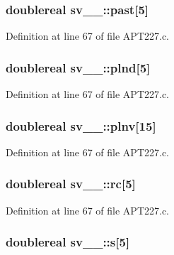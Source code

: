 \subsubsection[{\texorpdfstring{past}{past}}]{\setlength{\rightskip}{0pt plus 5cm}doublereal sv\+\_\+\_\+\+::past\mbox{[}5\mbox{]}}\hypertarget{structsv__1___a5b1db8c4c47306f0ac441f1c69b197ed}{}\label{structsv__1___a5b1db8c4c47306f0ac441f1c69b197ed}


Definition at line 67 of file A\+P\+T227.\+c.

\subsubsection[{\texorpdfstring{plnd}{plnd}}]{\setlength{\rightskip}{0pt plus 5cm}doublereal sv\+\_\+\_\+\+::plnd\mbox{[}5\mbox{]}}\hypertarget{structsv__1___a275dabf0aa8168ee1f97b4236e8e70e7}{}\label{structsv__1___a275dabf0aa8168ee1f97b4236e8e70e7}


Definition at line 67 of file A\+P\+T227.\+c.

\subsubsection[{\texorpdfstring{plnv}{plnv}}]{\setlength{\rightskip}{0pt plus 5cm}doublereal sv\+\_\+\_\+\+::plnv\mbox{[}15\mbox{]}}\hypertarget{structsv__1___aacac114ec75f0d240feb24700d1b1f70}{}\label{structsv__1___aacac114ec75f0d240feb24700d1b1f70}


Definition at line 67 of file A\+P\+T227.\+c.

\subsubsection[{\texorpdfstring{rc}{rc}}]{\setlength{\rightskip}{0pt plus 5cm}doublereal sv\+\_\+\_\+\+::rc\mbox{[}5\mbox{]}}\hypertarget{structsv__1___a6570078dd83e74c9e9010377b48621b4}{}\label{structsv__1___a6570078dd83e74c9e9010377b48621b4}


Definition at line 67 of file A\+P\+T227.\+c.

\subsubsection[{\texorpdfstring{s}{s}}]{\setlength{\rightskip}{0pt plus 5cm}doublereal sv\+\_\+\_\+\+::s\mbox{[}5\mbox{]}}\hypertarget{structsv__1___aa27f56a6d561835454c4e78f79cbc968}{}\label{structsv__1___aa27f56a6d561835454c4e78f79cbc968}


